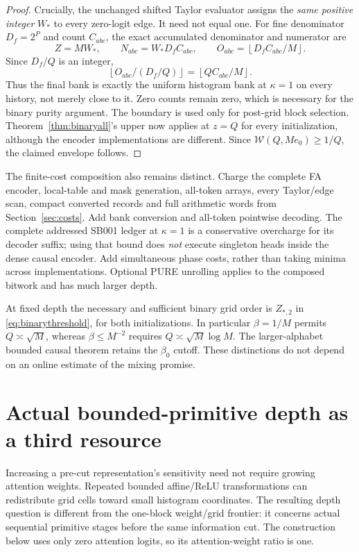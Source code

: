 \documentclass[11pt,letterpaper]{article}
\theoremstyle{definition}\newtheorem{definition}[theorem]{Definition}
\theoremstyle{remark}\newtheorem{remark}[theorem]{Remark}
\newcommand{\floor}[1]{\left\lfloor #1\right\rfloor}
\begin{document}
\begin{proof}
Crucially, the unchanged shifted Taylor evaluator assigns the \emph{same positive integer} $W_*$ to every zero-logit edge. It need not equal one. For fine denominator $D_f=2^P$ and count $C_{abc}$, the exact accumulated denominator and numerator are
\[
 Z=MW_*,\qquad N_{abc}=W_*D_fC_{abc},\qquad
 O_{abc}=\floor{D_fC_{abc}/M}.
\]
Since $D_f/Q$ is an integer,
\[
 \floor{O_{abc}/(D_f/Q)}=\floor{QC_{abc}/M}.
\]
Thus the final bank is exactly the uniform histogram bank at $\kappa=1$ on every history, not merely close to it. Zero counts remain zero, which is necessary for the binary purity argument. The boundary is used only for post-grid block selection. Theorem~\ref{thm:binaryall}'s upper now applies at $z=Q$ for every initialization, although the encoder implementations are different. Since $\mathcal W(Q,Me_0)\ge1/Q$, the claimed envelope follows.
\end{proof}

The finite-cost composition also remains distinct. Charge the complete FA encoder, local-table and mask generation, all-token arrays, every Taylor/edge scan, compact converted records and full arithmetic words from Section~\ref{sec:costs}. Add bank conversion and all-token pointwise decoding. The complete addressed SB001 ledger at $\kappa=1$ is a conservative overcharge for its decoder suffix; using that bound does \emph{not} execute singleton heads inside the dense causal encoder. Add simultaneous phase costs, rather than taking minima across implementations. Optional PURE unrolling applies to the composed bitwork and has much larger depth.

At fixed depth the necessary and sufficient binary grid order is $Z_{*,2}$ in \eqref{eq:binarythreshold}, for both initializations. In particular $\beta=1/M$ permits $Q\asymp\sqrt M$, whereas $\beta\le M^{-2}$ requires $Q\asymp\sqrt M\log M$. The larger-alphabet bounded causal theorem retains the $\beta_0$ cutoff. These distinctions do not depend on an online estimate of the mixing promise.

\section{Actual bounded-primitive depth as a third resource}\label{sec:depth}
Increasing a pre-cut representation's sensitivity need not require growing attention weights. Repeated bounded affine/ReLU transformations can redistribute grid cells toward small histogram coordinates. The resulting depth question is different from the one-block weight/grid frontier: it concerns actual sequential primitive stages before the same information cut. The construction below uses only zero attention logits, so its attention-weight ratio is one.
\end{document}
